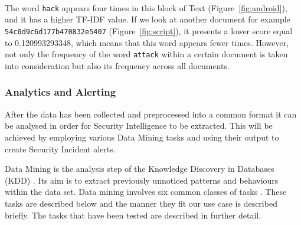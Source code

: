 \documentclass[12pt]{article}
\newcounter{subsubsubsection}[subsubsection]
\begin{document}
\hfill \break \\\\\\
The word \texttt{hack} appears four times in this block of Text (Figure~\ref{fig:android}), and it has a higher TF-IDF value. If we look at another document for example  \texttt{54c0d9c6d177b470832e5407} (Figure~\ref{fig:script}), it presents a lower score equal to  0.120993293348, which means that this word appears fewer times. However, not only the frequency of the word \texttt{attack} within a certain document is taken into consideration but also its frequency across all documents.\\
\hfill \break 
 
\newpage
\subsubsection{Analytics and Alerting}

After the data has been collected and preprocessed into a common format it can be analysed in order for Security Intelligence to be extracted.  This will be achieved by employing various Data Mining tasks and using their output to create Security Incident alerts. 

Data Mining is the analysis step of the Knowledge Discovery in Databases (KDD) \cite{datamining}. Its aim is to extract previously unnoticed patterns and behaviours within the data set. Data mining involves six common classes of tasks \cite{datamining}. These tasks are described below and the manner they fit our use case is described briefly. The tasks that have been tested are described in further detail. 
\end{document}
